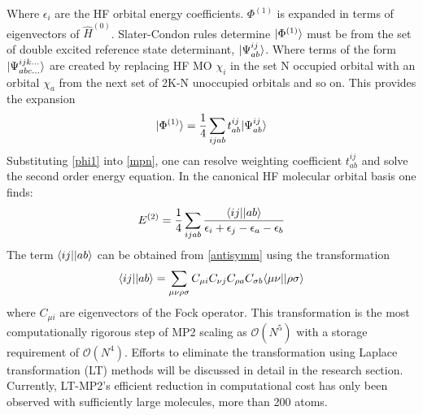        Where $\epsilon_i$ are the HF orbital energy coefficients. $\Phi^{(1)}$ is expanded in terms of eigenvectors of $\hat{H}^{(0)}$. Slater-Condon rules\cite{SzaboAttila1982} determine %
       $| \Phi^{(1)} \rangle$ must be from the set of double excited reference state determinant, $| \Psi^{ij}_{ab} \rangle$. Where terms of the form $| \Psi^{ijk\dots}_{abc\dots} \rangle$ are created by replacing HF MO $\chi_i$ in the set N occupied orbital with an orbital $\chi_a$ from the next set of 2K-N unoccupied orbitals and so on. This provides the expansion 
         \begin{equation} \label{phi1}
          | \Phi^{(1)} \rangle 
          = \frac{1}{4}\sum_{ijab} t^{ij}_{ab} | \Psi^{ij}_{ab} \rangle
        \end{equation}
      Substituting \cref{phi1} into \cref{mpn}, one can resolve weighting coefficient $t^{ij}_{ab}$ and solve the second order energy equation. In the canonical HF molecular orbital basis one finds:
        \begin{equation}
          E^{(2)} = \frac{1}{4} \sum_{ijab} \frac{\langle ij || ab \rangle}{\epsilon_i + \epsilon_j - \epsilon_a - \epsilon_b}
        \end{equation}
      The term $\langle ij || ab \rangle$ can be obtained from \cref{antisymm} using the transformation
        \begin{equation} \label{AO2MO}
          \langle ij || ab \rangle = \sum_{\mu\nu\rho\sigma} C_{\mu i} C_{\nu j} C_{\rho a} C_{\sigma b} \langle\mu \nu | | \rho \sigma \rangle
        \end{equation}
      where $C_{\mu i}$ are eigenvectors of the Fock operator. This transformation is the most computationally rigorous step of MP2 scaling as $\mathcal{O}(N^5)$ with a storage requirement of $\mathcal{O}(N^4)$. Efforts to eliminate the transformation using Laplace transformation (LT) methods will be discussed in detail in the research section. Currently, LT-MP2's efficient reduction in computational cost has only been observed with sufficiently large molecules, more than 200 atoms.  
